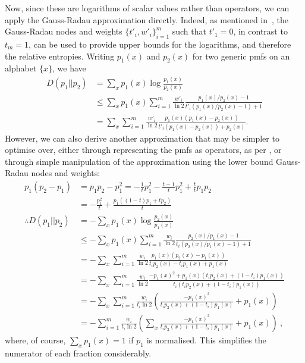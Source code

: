\documentclass[10pt, a4paper]{article}
\numberwithin{equation}{section} %
\theoremstyle{definition}
\theoremstyle{plain}
\newcommand{\?}{\mathrel{?}} %
\begin{document}
    Now, since these are logarithms of scalar values rather than operators, we can apply the Gauss-Radau approximation directly. Indeed, as mentioned in~\cite[Remark 2.10]{BFF_QRE}, the Gauss-Radau nodes and weights \({\{t'_i, w'_i\}}_{i=1}^m\) such that \(t'_1 = 0\), in contrast to \(t_m = 1\), can be used to provide upper bounds for the logarithms, and therefore the relative entropies. Writing \(p_1(x)\) and \(p_2(x)\) for two generic pmfs on an alphabet \(\{x\}\), we have
    \begin{align}
      D(p_1||p_2) &= \sum_x p_1(x) \log \frac{p_1(x)}{p_2(x)} \\
                  &\leq \sum_x p_1(x) \sum_{i=1}^m \frac{w'_i}{\ln 2} \frac{p_1(x)/p_2(x) - 1}{t'_i (p_1(x)/p_2(x)-1) + 1} \\
                  &= \sum_x \sum_{i=1}^m \frac{w'_i}{\ln 2} \frac{p_1(x)(p_1(x) - p_2(x))}{t'_i (p_1(x)- p_2(x)) + p_2(x)}.
    \end{align}
    However, we can also derive another approximation that may be simpler to optimise over, either through representing the pmfs as operators, as per , or through simple manipulation of the approximation using the lower bound Gauss-Radau nodes and weights:
    \begin{align}
      p_1(p_2-p_1) &= p_1p_2 - p_1^2  = -\frac{1}{t} p_1^2 - \frac{t-1}{t} p_1^2 + \frac{t}{t} p_1p_2 \\
                   &= -\frac{p_1^2}{t} + \frac{p_1((1-t)p_1+tp_2)}{t}  \\
      \therefore D(p_1||p_2) &= -\sum_x p_1(x) \log \frac{p_2(x)}{p_1(x)} \\
                  &\leq -\sum_x p_1(x) \sum_{i=1}^m \frac{w_i}{\ln 2} \frac{p_2(x)/p_1(x) - 1}{t_i (p_2(x)/p_1(x)-1) + 1} \\
                  &= -\sum_x \sum_{i=1}^m \frac{w_i}{\ln 2} \frac{p_1(x) (p_2(x) - p_1(x))}{t_i p_2(x) - t_i p_1(x) + p_1(x)} \\
                  &= -\sum_x \sum_{i=1}^m \frac{w_i}{\ln 2} \frac{-{p_1(x)}^2 + p_1(x)(t_i p_2(x) + (1-t_i) p_1(x))}{t_i (t_i p_2(x) + (1-t_i) p_1(x)) } \\
                  &= -\sum_x \sum_{i=1}^m \frac{w_i}{t_i \ln 2}\left( \frac{-{p_1(x)}^2}{t_i p_2(x) + (1-t_i) p_1(x)} + p_1(x) \right)\\
                  &= -\sum_{i=1}^m \frac{w_i}{t_i \ln 2}\left( \sum_x \frac{-{p_1(x)}^2}{t_i p_2(x) + (1-t_i) p_1(x)} + p_1(x) \right)~\label{eqn:logratbound},
    \end{align}
    where, of course, \(\sum_x p_1(x) = 1\) if \(p_1\) is normalised. This simplifies the numerator of each fraction considerably. 
\end{document}
